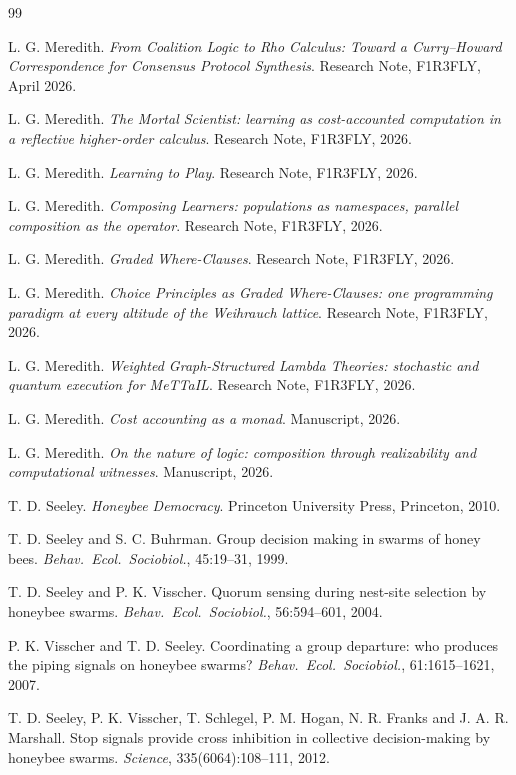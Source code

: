 \documentclass[11pt,a4paper]{article}
\theoremstyle{plain}
\theoremstyle{definition}
\theoremstyle{remark}
\begin{document}
\begin{thebibliography}{99}

 L. G. Meredith. \emph{From Coalition Logic to Rho
Calculus: Toward a Curry--Howard Correspondence for Consensus Protocol
Synthesis}. Research Note, F1R3FLY, April 2026.

 L. G. Meredith. \emph{The Mortal Scientist: learning
as cost-accounted computation in a reflective higher-order calculus}. Research
Note, F1R3FLY, 2026.

 L. G. Meredith. \emph{Learning to Play}. Research Note,
F1R3FLY, 2026.

 L. G. Meredith. \emph{Composing Learners: populations as
namespaces, parallel composition as the operator}. Research Note, F1R3FLY, 2026.

 L. G. Meredith. \emph{Graded Where-Clauses}. Research
Note, F1R3FLY, 2026.

 L. G. Meredith. \emph{Choice Principles as Graded
Where-Clauses: one programming paradigm at every altitude of the Weihrauch
lattice}. Research Note, F1R3FLY, 2026.

 L. G. Meredith. \emph{Weighted Graph-Structured Lambda
Theories: stochastic and quantum execution for MeTTaIL}. Research Note,
F1R3FLY, 2026.

 L. G. Meredith. \emph{Cost accounting as a monad}.
Manuscript, 2026.

 L. G. Meredith. \emph{On the nature of logic:
composition through realizability and computational witnesses}. Manuscript,
2026.

 T. D. Seeley. \emph{Honeybee Democracy}. Princeton
University Press, Princeton, 2010.

 T. D. Seeley and S. C. Buhrman. Group decision making in
swarms of honey bees. \emph{Behav.\ Ecol.\ Sociobiol.}, 45:19--31, 1999.

 T. D. Seeley and P. K. Visscher. Quorum sensing during
nest-site selection by honeybee swarms. \emph{Behav.\ Ecol.\ Sociobiol.},
56:594--601, 2004.

 P. K. Visscher and T. D. Seeley. Coordinating a group
departure: who produces the piping signals on honeybee swarms?
\emph{Behav.\ Ecol.\ Sociobiol.}, 61:1615--1621, 2007.

 T. D. Seeley, P. K. Visscher, T. Schlegel, P. M.
Hogan, N. R. Franks and J. A. R. Marshall. Stop signals provide cross
inhibition in collective decision-making by honeybee swarms. \emph{Science},
335(6064):108--111, 2012.


\end{thebibliography}
\end{document}
